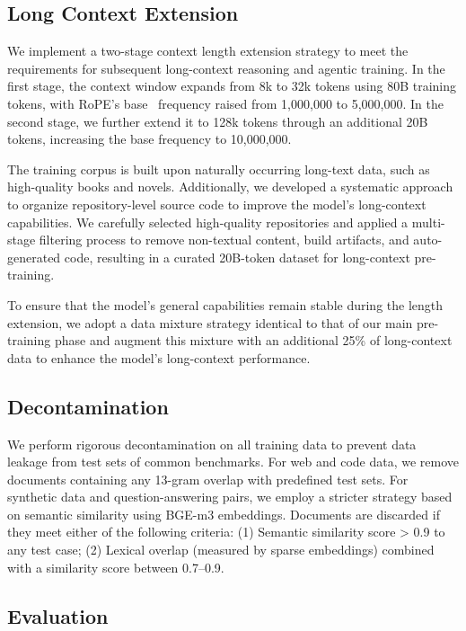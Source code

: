 \documentclass{article}
\begin{document}
\subsection{Long Context Extension}
We implement a two-stage context length extension strategy to meet the requirements for subsequent long-context reasoning and agentic training. In the first stage, the context window expands from 8k to 32k tokens using 80B training tokens, with RoPE's base~\citep{su2024roformer} frequency raised from 1,000,000 to 5,000,000. In the second stage, we further extend it to 128k tokens through an additional 20B tokens, increasing the base frequency to 10,000,000.

The training corpus is built upon naturally occurring long-text data, such as high-quality books and novels. 
Additionally, we developed a systematic approach to organize repository-level source code to improve the model's long-context capabilities. 
We carefully selected high-quality repositories and applied a multi-stage filtering process to remove non-textual content, build artifacts, and auto-generated code, resulting in a curated 20B-token dataset for long-context pre-training.

To ensure that the model's general capabilities remain stable during the length extension, we adopt a data mixture strategy identical to that of our main pre-training phase and augment this mixture with an additional 25\% of long-context data to enhance the model's long-context performance.

\subsection{Decontamination}

We perform rigorous decontamination on all training data to prevent data leakage from test sets of common benchmarks. For web and code data, we remove documents containing any 13-gram overlap with predefined test sets. For synthetic data and question-answering pairs, we employ a stricter strategy based on semantic similarity using BGE-m3 \citep{bge-m3} embeddings. Documents are discarded if they meet either of the following criteria: (1) Semantic similarity score > 0.9 to any test case; (2) Lexical overlap (measured by sparse embeddings) combined with a similarity score between 0.7–0.9.

\subsection{Evaluation}
\newcommand{\red}[1]{\textcolor{red}{#1}}
\end{document}
